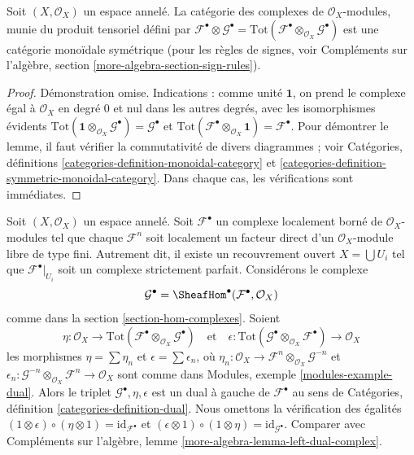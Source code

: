 {\begin{lemma}
\label{lemma-symmetric-monoidal-cat-complexes}

Soit $(X, \mathcal{O}_X)$ un espace annelé. La catégorie des complexes de $\mathcal{O}_X$-modules, munie du produit tensoriel défini par
$\mathcal{F}^\bullet \otimes \mathcal{G}^\bullet =
\text{Tot}(\mathcal{F}^\bullet \otimes_{\mathcal{O}_X} \mathcal{G}^\bullet)$
est une catégorie monoïdale symétrique (pour les règles de signes, voir Compléments sur l'algèbre, section \ref{more-algebra-section-sign-rules}).

\end{lemma}

\begin{proof}
Démonstration omise. Indications : comme unité $\mathbf{1}$, on prend le complexe égal à $\mathcal{O}_X$ en degré $0$ et nul dans les autres degrés, avec les isomorphismes évidents $\text{Tot}(\mathbf{1} \otimes_{\mathcal{O}_X} \mathcal{G}^\bullet) =
\mathcal{G}^\bullet$ et $\text{Tot}(\mathcal{F}^\bullet \otimes_{\mathcal{O}_X} \mathbf{1}) =
\mathcal{F}^\bullet$. Pour démontrer le lemme, il faut vérifier la commutativité de divers diagrammes ; voir Catégories, définitions \ref{categories-definition-monoidal-category} et \ref{categories-definition-symmetric-monoidal-category}. Dans chaque cas, les vérifications sont immédiates.
\end{proof}

\begin{example}

\label{example-dual}

Soit $(X, \mathcal{O}_X)$ un espace annelé. Soit $\mathcal{F}^\bullet$
un complexe localement borné de $\mathcal{O}_X$-modules tel que chaque
$\mathcal{F}^n$ soit localement un facteur direct d'un $\mathcal{O}_X$-module libre de type fini. Autrement dit, il existe un recouvrement ouvert
$X = \bigcup U_i$ tel que $\mathcal{F}^\bullet|_{U_i}$ soit un complexe strictement parfait. Considérons le complexe
$$
\mathcal{G}^\bullet = \SheafHom^\bullet(\mathcal{F}^\bullet, \mathcal{O}_X)
$$
comme dans la section \ref{section-hom-complexes}. Soient
$$
\eta :
\mathcal{O}_X
\to
\text{Tot}(\mathcal{F}^\bullet \otimes_{\mathcal{O}_X} \mathcal{G}^\bullet)
\quad\text{et}\quad
\epsilon :
\text{Tot}(\mathcal{G}^\bullet \otimes_{\mathcal{O}_X} \mathcal{F}^\bullet)
\to
\mathcal{O}_X
$$
les morphismes $\eta = \sum \eta_n$ et $\epsilon = \sum \epsilon_n$,
où $\eta_n : \mathcal{O}_X \to
\mathcal{F}^n \otimes_{\mathcal{O}_X} \mathcal{G}^{-n}$
et
$\epsilon_n : \mathcal{G}^{-n} \otimes_{\mathcal{O}_X} \mathcal{F}^n
\to \mathcal{O}_X$ sont comme dans Modules, exemple \ref{modules-example-dual}. Alors le triplet $\mathcal{G}^\bullet, \eta, \epsilon$
est un dual à gauche de $\mathcal{F}^\bullet$ au sens de Catégories, définition \ref{categories-definition-dual}. Nous omettons la vérification des égalités
$(1 \otimes \epsilon) \circ (\eta \otimes 1) = \text{id}_{\mathcal{F}^\bullet}$
et
$(\epsilon \otimes 1) \circ (1 \otimes \eta) =
\text{id}_{\mathcal{G}^\bullet}$. Comparer avec Compléments sur l'algèbre, lemme \ref{more-algebra-lemma-left-dual-complex}.


\end{example}}
